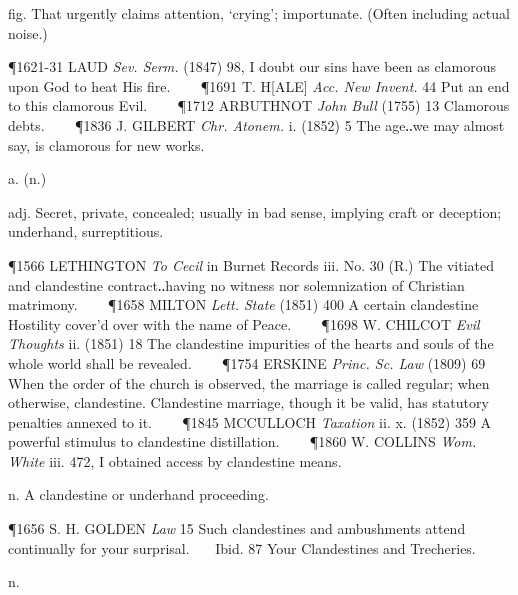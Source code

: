 \begin{description}[wide, labelwidth=!, labelindent=0pt]
\begin{myenumerate}
 fig. That urgently claims attention, ‘crying’; importunate. (Often including actual noise.)

\P 1621-31 LAUD  \textit{Sev. Serm.} (1847) 98, I doubt our sins have been as clamorous upon God to heat His fire.    
\P 1691 T. H[ALE]  \textit{Acc. New Invent.} 44 Put an end to this clamorous Evil.    
\P 1712 ARBUTHNOT  \textit{John Bull} (1755) 13 Clamorous debts.    
\P 1836 J. GILBERT  \textit{Chr. Atonem.} i. (1852) 5 The age‥we may almost say, is clamorous for new works.
\end{myenumerate}


 a. (n.)

\noindent {}

\vspace{-0.3cm}

\begin{myenumerate}

 adj. Secret, private, concealed; usually in bad sense, implying craft or deception; underhand, surreptitious.

\P 1566 LETHINGTON  \textit{To Cecil} in Burnet Records iii. No. 30 (R.) The vitiated and clandestine contract‥having no witness nor solemnization of Christian matrimony.    
\P 1658 MILTON  \textit{Lett. State} (1851) 400 A certain clandestine Hostility cover'd over with the name of Peace.    
\P 1698 W. CHILCOT  \textit{Evil Thoughts} ii. (1851) 18 The clandestine impurities of the hearts and souls of the whole world shall be revealed.    
\P 1754 ERSKINE  \textit{Princ. Sc. Law} (1809) 69 When the order of the church is observed, the marriage is called regular; when otherwise, clandestine. Clandestine marriage, though it be valid, has statutory penalties annexed to it.    
\P 1845 MCCULLOCH  \textit{Taxation} ii. x. (1852) 359 A powerful stimulus to clandestine distillation.    
\P 1860 W. COLLINS  \textit{Wom. White} iii. 472, I obtained access by clandestine means.

 n. A clandestine or underhand proceeding.

\P 1656 S. H. GOLDEN  \textit{Law} 15 Such clandestines and ambushments attend continually for your surprisal.    Ibid. 87 Your Clandestines and Trecheries.
\end{myenumerate}


 n.


\end{description}
